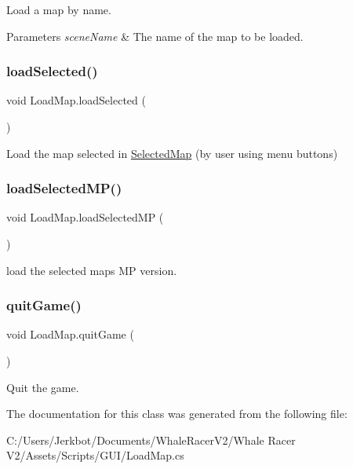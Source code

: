 Load a map by name. 


\begin{DoxyParams}{Parameters}
{\em scene\+Name} & The name of the map to be loaded.\\
\hline
\end{DoxyParams}
\mbox{\label{class_load_map_a4a8c391affd364e57aa0baa73baf9a47}} 
\subsubsection{\texorpdfstring{load\+Selected()}{loadSelected()}}
{\footnotesize\ttfamily void Load\+Map.\+load\+Selected (\begin{DoxyParamCaption}{ }\end{DoxyParamCaption})}



Load the map selected in \hyperlink{class_selected_map}{Selected\+Map} (by user using menu buttons) 

\mbox{\label{class_load_map_ad9dcb42d843c853bebaf8b0207f74ee9}} 
\subsubsection{\texorpdfstring{load\+Selected\+M\+P()}{loadSelectedMP()}}
{\footnotesize\ttfamily void Load\+Map.\+load\+Selected\+MP (\begin{DoxyParamCaption}{ }\end{DoxyParamCaption})}



load the selected map\textquotesingle{}s MP version. 

\mbox{\label{class_load_map_a256a172f9b18774eed707b43c1fbd452}} 
\subsubsection{\texorpdfstring{quit\+Game()}{quitGame()}}
{\footnotesize\ttfamily void Load\+Map.\+quit\+Game (\begin{DoxyParamCaption}{ }\end{DoxyParamCaption})}



Quit the game. 



The documentation for this class was generated from the following file\+:\begin{DoxyCompactItemize}
\item 
C\+:/\+Users/\+Jerkbot/\+Documents/\+Whale\+Racer\+V2/\+Whale Racer V2/\+Assets/\+Scripts/\+G\+U\+I/Load\+Map.\+cs\end{DoxyCompactItemize}
